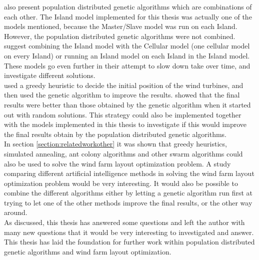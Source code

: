 \noindent \cite{Gong} also present population distributed genetic algorithms which are combinations of each other. The Island model implemented for this thesis was actually one of the models mentioned, because the Master/Slave model was run on each Island. However, the population distributed genetic algorithms were not combined. \citep{Gong} suggest combining the Island model with the Cellular model (one cellular model on every Island) or running an Island model on each Island in the Island model. These models go even further in their attempt to slow down take over time, and investigate different solutions.\\


\noindent \cite{Saavedra-Morena} used a greedy heuristic to decide the initial position of the wind turbines, and then used the genetic algorithm to improve the results. \cite{Saavedra-Morena} showed that the final results were better than those obtained by the genetic algorithm when it started out with random solutions. This strategy could also be implemented together with the models implemented in this thesis to investigate if this would improve the final results obtain by the population distributed genetic algorithms. \\


\noindent In section \ref{section:relatedworkother} it was shown that greedy heuristics, simulated annealing, ant colony algorithms and other swarm algorithms could also be used to solve the wind farm layout optimization problem. A study comparing different artificial intelligence methods in solving the wind farm layout optimization problem would be very interesting. It would also be possible to combine the different algorithms either by letting a genetic algorithm run first at trying to let one of the other methods improve the final results, or the other way around. \\

\noindent As discussed, this thesis has answered some questions and left the author with many new questions that it would be very interesting to investigated and answer. This thesis has laid the foundation for further work within population distributed genetic algorithms and wind farm layout optimization.\\